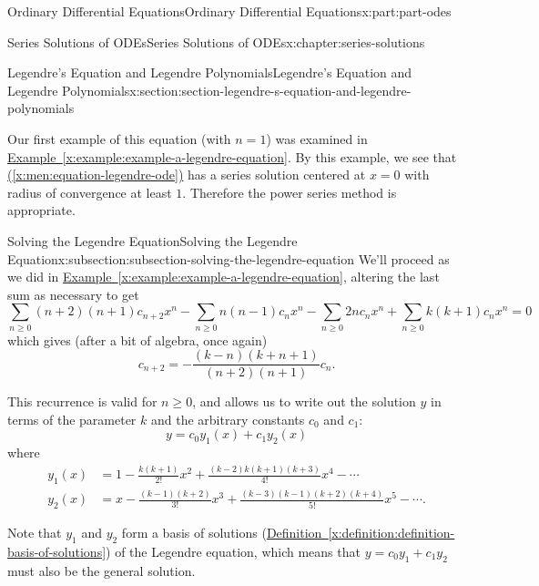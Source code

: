\documentclass[twoside,10pt,]{book}
\newcommand{\xreffont}{\relax}
\numberwithin{equation}{part}
\newcommand{\amp}{&}
\begin{document}
\begin{partptx}{Ordinary Differential Equations}{}{Ordinary Differential Equations}{}{}{x:part:part-odes}
\begin{chapterptx}{Series Solutions of ODEs}{}{Series Solutions of ODEs}{}{}{x:chapter:series-solutions}
\begin{sectionptx}{Legendre's Equation and Legendre Polynomials}{}{Legendre's Equation and Legendre Polynomials}{}{}{x:section:section-legendre-s-equation-and-legendre-polynomials}
\begin{introduction}{}
Our first example of this equation (with \(n = 1\)) was examined in \hyperref[x:example:example-a-legendre-equation]{Example~{\xreffont\ref{x:example:example-a-legendre-equation}}}. By this example, we see that \hyperref[x:men:equation-legendre-ode]{({\xreffont\ref{x:men:equation-legendre-ode}})} has a series solution centered at \(x = 0\) with radius of convergence at least \(1\). Therefore the power series method is appropriate.%
\end{introduction}%
%
%
\typeout{************************************************}
\typeout{************************************************}
%
\begin{subsectionptx}{Solving the Legendre Equation}{}{Solving the Legendre Equation}{}{}{x:subsection:subsection-solving-the-legendre-equation}
We'll proceed as we did in \hyperref[x:example:example-a-legendre-equation]{Example~{\xreffont\ref{x:example:example-a-legendre-equation}}}, altering the last sum as necessary to get%
\begin{equation*}
\sum_{n\geq0}(n+2)(n+1)c_{n+2}x^{n} - \sum_{n\geq0}n(n-1)c_{n}x^{n} - \sum_{n\geq0}2nc_{n}x^{n} + \sum_{n\geq0}k(k+1)c_{n}x^{n} = 0
\end{equation*}
which gives (after a bit of algebra, once again)%
\begin{equation*}
c_{n+2} = -\frac{(k - n)(k + n + 1)}{(n + 2)(n + 1)}c_{n}\text{.}
\end{equation*}
%
\par
This recurrence is valid for \(n \geq 0\), and allows us to write out the solution \(y\) in terms of the parameter \(k\) and the arbitrary constants \(c_{0}\) and \(c_{1}\):%
\begin{equation*}
y = c_{0}y_{1}(x) + c_{1}y_{2}(x)
\end{equation*}
where%
\begin{align}
y_{1}(x) \amp = 1 - \frac{k(k+1)}{2!}x^{2} + \frac{(k - 2)k(k+1)(k + 3)}{4!}x^{4} - \cdots\label{x:mrow:equation-legendre-soln-y1}\\
y_{2}(x) \amp = x - \frac{(k-1)(k+2)}{3!}x^{3} + \frac{(k-3)(k-1)(k+2)(k+4)}{5!}x^{5} - \cdots \text{.}\label{x:mrow:equation-legendre-soln-y2}
\end{align}
%
\par
Note that \(y_{1}\) and \(y_{2}\) form a basis of solutions (\hyperref[x:definition:definition-basis-of-solutions]{Definition~{\xreffont\ref{x:definition:definition-basis-of-solutions}}}) of the Legendre equation, which means that \(y = c_{0}y_{1} + c_{1}y_{2}\) must also be the general solution.%

\end{subsectionptx}
\end{sectionptx}
\end{chapterptx}
\end{partptx}
\end{document}
